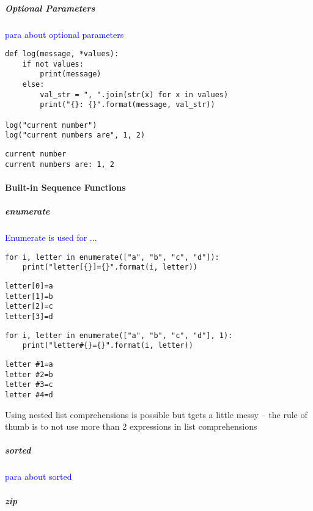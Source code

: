 \subparagraph{Optional Parameters}

\textcolor{blue}{para about optional parameters}

\begin{lstlisting}[style=pyInStyle]
def log(message, *values):
    if not values:
        print(message)
    else:
        val_str = ", ".join(str(x) for x in values)
        print("{}: {}".format(message, val_str))

log("current number")
log("current numbers are", 1, 2)
\end{lstlisting}
\begin{lstlisting}[style=pyOutStyle]
current number
current numbers are: 1, 2
\end{lstlisting}

\paragraph{Built-in Sequence Functions}

\subparagraph{enumerate}

\textcolor{blue}{Enumerate is used for ...}

\begin{lstlisting}[style=pyInStyle]
for i, letter in enumerate(["a", "b", "c", "d"]):
    print("letter[{}]={}".format(i, letter))
\end{lstlisting}
\begin{lstlisting}[style=pyOutStyle]
letter[0]=a
letter[1]=b
letter[2]=c
letter[3]=d
\end{lstlisting}


\begin{lstlisting}[style=pyInStyle]
for i, letter in enumerate(["a", "b", "c", "d"], 1):
    print("letter#{}={}".format(i, letter))
\end{lstlisting}
\begin{lstlisting}[style=pyOutStyle]
letter #1=a
letter #2=b
letter #3=c
letter #4=d
\end{lstlisting}
\begin{markdown}
Using nested list comprehensions is possible but tgets a little messy -- the rule of thumb is to not use more than 2 expressions in list comprehensions
\end{markdown}


\subparagraph{sorted}

\textcolor{blue}{para about sorted}

\subparagraph{zip}

